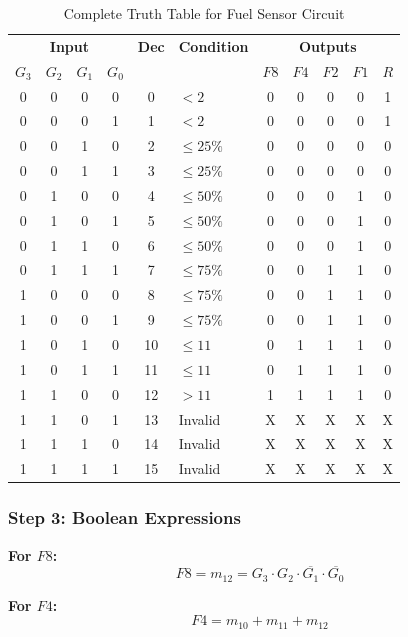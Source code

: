 \documentclass[12pt,a4paper]{article}
\begin{document}
\begin{table}[H]
\centering
\caption{Complete Truth Table for Fuel Sensor Circuit}
\small
\begin{tabular}{cccc|c|l|ccccc}
\toprule
\multicolumn{4}{c|}{\textbf{Input}} & \textbf{Dec} & \textbf{Condition} & \multicolumn{5}{c}{\textbf{Outputs}} \\
$G_3$ & $G_2$ & $G_1$ & $G_0$ & & & $F8$ & $F4$ & $F2$ & $F1$ & $R$ \\
\midrule
0 & 0 & 0 & 0 & 0 & $< 2$ & 0 & 0 & 0 & 0 & 1 \\
0 & 0 & 0 & 1 & 1 & $< 2$ & 0 & 0 & 0 & 0 & 1 \\
0 & 0 & 1 & 0 & 2 & $\leq 25\%$ & 0 & 0 & 0 & 0 & 0 \\
0 & 0 & 1 & 1 & 3 & $\leq 25\%$ & 0 & 0 & 0 & 0 & 0 \\
0 & 1 & 0 & 0 & 4 & $\leq 50\%$ & 0 & 0 & 0 & 1 & 0 \\
0 & 1 & 0 & 1 & 5 & $\leq 50\%$ & 0 & 0 & 0 & 1 & 0 \\
0 & 1 & 1 & 0 & 6 & $\leq 50\%$ & 0 & 0 & 0 & 1 & 0 \\
0 & 1 & 1 & 1 & 7 & $\leq 75\%$ & 0 & 0 & 1 & 1 & 0 \\
1 & 0 & 0 & 0 & 8 & $\leq 75\%$ & 0 & 0 & 1 & 1 & 0 \\
1 & 0 & 0 & 1 & 9 & $\leq 75\%$ & 0 & 0 & 1 & 1 & 0 \\
1 & 0 & 1 & 0 & 10 & $\leq 11$ & 0 & 1 & 1 & 1 & 0 \\
1 & 0 & 1 & 1 & 11 & $\leq 11$ & 0 & 1 & 1 & 1 & 0 \\
1 & 1 & 0 & 0 & 12 & $> 11$ & 1 & 1 & 1 & 1 & 0 \\
1 & 1 & 0 & 1 & 13 & Invalid & X & X & X & X & X \\
1 & 1 & 1 & 0 & 14 & Invalid & X & X & X & X & X \\
1 & 1 & 1 & 1 & 15 & Invalid & X & X & X & X & X \\
\bottomrule
\end{tabular}
\end{table}

\subsubsection{Step 3: Boolean Expressions}

\textbf{For $F8$:}
\[F8 = m_{12} = G_3 \cdot G_2 \cdot \overline{G_1} \cdot \overline{G_0}\]

\textbf{For $F4$:}
\[F4 = m_{10} + m_{11} + m_{12}\]
\end{document}
